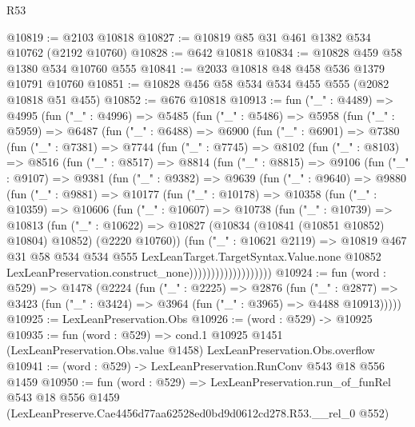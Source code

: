 \begin{lexlean}{R53}
\begin{coremodule}
@10819 := @2103 @10818
@10827 := @10819 @85 @31 @461 @1382 @534 @10762 (@2192 @10760)
@10828 := @642 @10818
@10834 := @10828 @459 @58 @1380 @534 @10760 @555
@10841 := @2033 @10818 @48 @458 @536 @1379 @10791 @10760
@10851 := @10828 @456 @58 @534 @534 @455 @555 (@2082 @10818 @51 @455)
@10852 := @676 @10818
@10913 := fun ("_" : @4489) =>
  @4995
    (fun ("_" : @4996) =>
    @5485
      (fun ("_" : @5486) =>
      @5958
        (fun ("_" : @5959) =>
        @6487
          (fun ("_" : @6488) =>
          @6900
            (fun ("_" : @6901) =>
            @7380
              (fun ("_" : @7381) =>
              @7744
                (fun ("_" : @7745) =>
                @8102
                  (fun ("_" : @8103) =>
                  @8516
                    (fun ("_" : @8517) =>
                    @8814
                      (fun ("_" : @8815) =>
                      @9106
                        (fun ("_" : @9107) =>
                        @9381
                          (fun ("_" : @9382) =>
                          @9639
                            (fun ("_" : @9640) =>
                            @9880
                              (fun ("_" : @9881) =>
                              @10177
                                (fun ("_" : @10178) =>
                                @10358
                                  (fun ("_" : @10359) =>
                                  @10606
                                    (fun ("_" : @10607) =>
                                    @10738
                                      (fun ("_" : @10739) =>
                                      @10813
                                        (fun ("_" : @10622) =>
                                        @10827
                                          (@10834 (@10841 (@10851 @10852) @10804) @10852)
                                          (@2220 @10760))
                                        (fun ("_" : @10621 @2119) =>
                                        @10819
                                          @467
                                          @31
                                          @58
                                          @534
                                          @534
                                          @555
                                          LexLeanTarget.TargetSyntax.Value.none
                                          @10852
                                          LexLeanPreservation.construct_none)))))))))))))))))))
@10924 := fun (word : @529) =>
  @1478
    (@2224
      (fun ("_" : @2225) =>
      @2876
        (fun ("_" : @2877) =>
        @3423 (fun ("_" : @3424) => @3964 (fun ("_" : @3965) => @4488 @10913)))))
@10925 := LexLeanPreservation.Obs
@10926 := (word : @529) -> @10925
@10935 := fun (word : @529) =>
  cond.{1} @10925 @1451 (LexLeanPreservation.Obs.value @1458) LexLeanPreservation.Obs.overflow
@10941 := (word : @529) -> LexLeanPreservation.RunConv @543 @18 @556 @1459
@10950 := fun (word : @529) =>
  LexLeanPreservation.run_of_funRel
    @543
    @18
    @556
    @1459
    (LexLeanPreserve.Cae4456d77aa62528ed0bd9d0612cd278.R53.__rel_0 @552)
\end{coremodule}
\end{lexlean}
